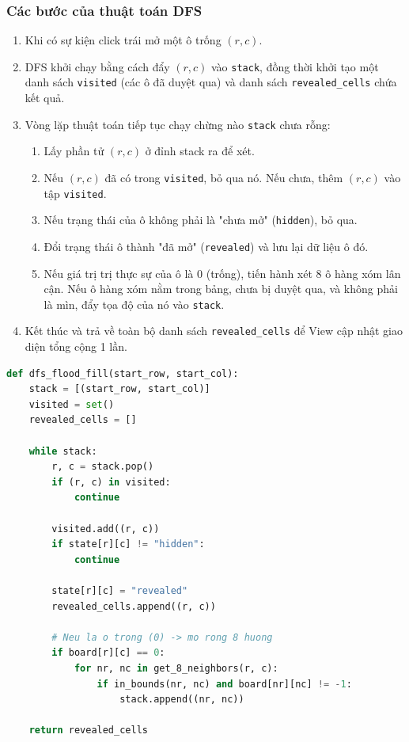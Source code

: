\subsubsection{Các bước của thuật toán DFS}
\begin{enumerate}
    \item Khi có sự kiện click trái mở một ô trống $(r, c)$.
    \item DFS khởi chạy bằng cách đẩy $(r, c)$ vào \texttt{stack}, đồng thời khởi tạo một danh sách \texttt{visited} (các ô đã duyệt qua) và danh sách \texttt{revealed\_cells} chứa kết quả.
    \item Vòng lặp thuật toán tiếp tục chạy chừng nào \texttt{stack} chưa rỗng:
    \begin{enumerate}
        \item Lấy phần tử $(r, c)$ ở đỉnh stack ra để xét.
        \item Nếu $(r, c)$ đã có trong \texttt{visited}, bỏ qua nó. Nếu chưa, thêm $(r, c)$ vào tập \texttt{visited}.
        \item Nếu trạng thái của ô không phải là "chưa mở" (\texttt{hidden}), bỏ qua.
        \item Đổi trạng thái ô thành "đã mở" (\texttt{revealed}) và lưu lại dữ liệu ô đó.
        \item Nếu giá trị trị thực sự của ô là $0$ (trống), tiến hành xét 8 ô hàng xóm lân cận. Nếu ô hàng xóm nằm trong bảng, chưa bị duyệt qua, và không phải là mìn, đẩy tọa độ của nó vào \texttt{stack}.
    \end{enumerate}
    \item Kết thúc và trả về toàn bộ danh sách \texttt{revealed\_cells} để View cập nhật giao diện tổng cộng 1 lần.
\end{enumerate}

\begin{lstlisting}[language=Python, caption=Mã giả thuật toán DFS Flood Fill (Iterative)]
def dfs_flood_fill(start_row, start_col):
    stack = [(start_row, start_col)]
    visited = set()
    revealed_cells = []
    
    while stack:
        r, c = stack.pop()
        if (r, c) in visited: 
            continue
            
        visited.add((r, c))
        if state[r][c] != "hidden":
            continue
            
        state[r][c] = "revealed"
        revealed_cells.append((r, c))
        
        # Neu la o trong (0) -> mo rong 8 huong
        if board[r][c] == 0:
            for nr, nc in get_8_neighbors(r, c):
                if in_bounds(nr, nc) and board[nr][nc] != -1:
                    stack.append((nr, nc))
                    
    return revealed_cells
\end{lstlisting}


